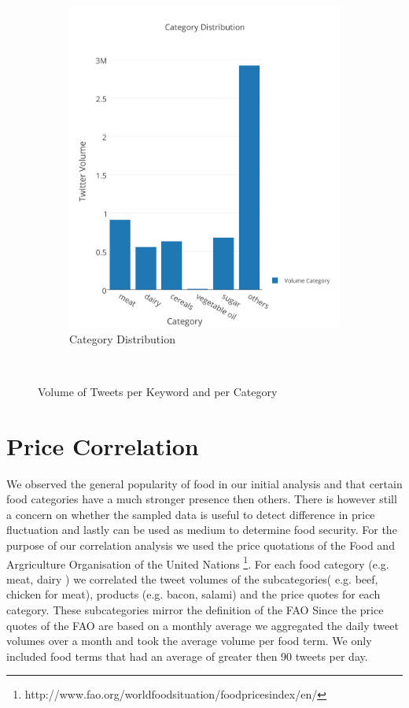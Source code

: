 \begin{figure}[H]
\begin{subfigure}[b]{0.5\textwidth}
                \includegraphics[width=\textwidth]{img/anal/exp_dist_cat}
                \caption{Category Distribution}
                \label{fig:cat}
        \end{subfigure}
        ~ %
      
        \caption{Volume of Tweets per Keyword and per Category}\label{fig:distribution}
\end{figure}


\section{Price Correlation}


We observed the general popularity of food in our initial analysis and that certain food categories have a much stronger presence then others. There is however still a concern on whether the sampled data is useful to detect difference in price fluctuation and lastly can  be used as medium to determine food security. For the purpose of our correlation analysis we used the price quotations of the Food and Argriculture Organisation of the United Nations \footnote{http://www.fao.org/worldfoodsituation/foodpricesindex/en/}. For each food category (e.g. meat, dairy ) we correlated the tweet volumes of the subcategories( e.g. beef, chicken for meat), products (e.g. bacon, salami) and the price quotes for each category. These subcategories mirror the definition of the FAO \cite{fao2008} Since the price quotes of the FAO are based on a monthly average we aggregated the daily tweet volumes over a month and took the average volume per food term. We only included food terms that had an average of greater then 90 tweets per day.  

